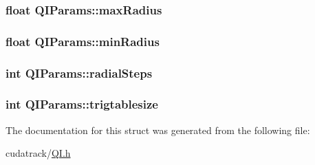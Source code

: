 \subsubsection[{\texorpdfstring{max\+Radius}{maxRadius}}]{\setlength{\rightskip}{0pt plus 5cm}float Q\+I\+Params\+::max\+Radius}\hypertarget{struct_q_i_params_a59a4abd887cfec3392bb5ecd6891d7d6}{}\label{struct_q_i_params_a59a4abd887cfec3392bb5ecd6891d7d6}
\subsubsection[{\texorpdfstring{min\+Radius}{minRadius}}]{\setlength{\rightskip}{0pt plus 5cm}float Q\+I\+Params\+::min\+Radius}\hypertarget{struct_q_i_params_a4c3b954348ae3ee381eab69122983515}{}\label{struct_q_i_params_a4c3b954348ae3ee381eab69122983515}
\subsubsection[{\texorpdfstring{radial\+Steps}{radialSteps}}]{\setlength{\rightskip}{0pt plus 5cm}int Q\+I\+Params\+::radial\+Steps}\hypertarget{struct_q_i_params_a19b7d550113364de4e4f11e2c9cfea0e}{}\label{struct_q_i_params_a19b7d550113364de4e4f11e2c9cfea0e}
\subsubsection[{\texorpdfstring{trigtablesize}{trigtablesize}}]{\setlength{\rightskip}{0pt plus 5cm}int Q\+I\+Params\+::trigtablesize}\hypertarget{struct_q_i_params_a2078879365690b162cac67e45837a29d}{}\label{struct_q_i_params_a2078879365690b162cac67e45837a29d}


The documentation for this struct was generated from the following file\+:\begin{DoxyCompactItemize}
\item 
cudatrack/\hyperlink{_q_i_8h}{Q\+I.\+h}\end{DoxyCompactItemize}
